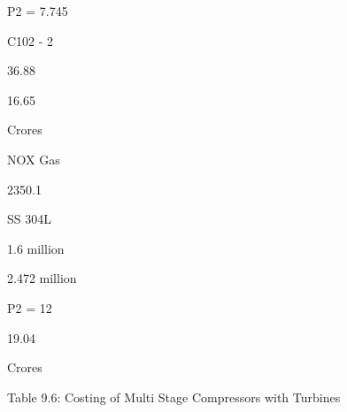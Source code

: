 \documentclass[a4paper,portrait,12pt]{article}
\begin{document}
\begin{flushleft}
P2 = 7.745
\end{flushleft}


\begin{flushleft}
C102 - 2
\end{flushleft}





36.88





16.65


\begin{flushleft}
Crores
\end{flushleft}





\begin{flushleft}
NOX Gas
\end{flushleft}





2350.1





\begin{flushleft}
SS 304L
\end{flushleft}





\begin{flushleft}
1.6 million
\end{flushleft}





\begin{flushleft}
2.472 million
\end{flushleft}





\begin{flushleft}
P2 = 12
\end{flushleft}





19.04


\begin{flushleft}
Crores
\end{flushleft}





\begin{flushleft}
Table 9.6: Costing of Multi Stage Compressors with Turbines
\end{flushleft}
\end{document}
